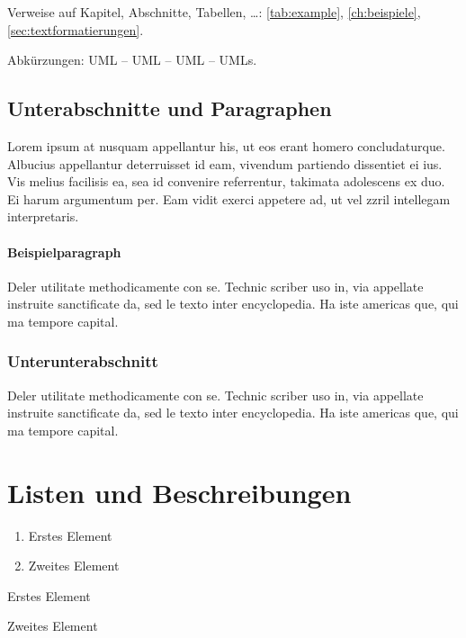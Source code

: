 Verweise auf Kapitel, Abschnitte, Tabellen, \dots: \autoref{tab:example}, \autoref{ch:beispiele}, \autoref{sec:textformatierungen}.

Abkürzungen: \ac{UML} -- \acs{UML} -- \acf{UML} -- \acp{UML}. 

\subsection{Unterabschnitte und Paragraphen}
Lorem ipsum at nusquam appellantur his, ut eos erant homero concludaturque. Albucius appellantur deterruisset id eam, vivendum partiendo dissentiet ei ius. Vis melius facilisis ea, sea id convenire referrentur, takimata adolescens ex duo. Ei harum argumentum per. Eam vidit exerci appetere ad, ut vel zzril intellegam interpretaris.

\paragraph{Beispielparagraph} 
Deler utilitate methodicamente con se. Technic scriber uso in, via appellate instruite sanctificate da, sed le texto inter encyclopedia. Ha iste americas que, qui ma tempore capital. 

\subsubsection{Unterunterabschnitt}
Deler utilitate methodicamente con se. Technic scriber uso in, via appellate instruite sanctificate da, sed le texto inter encyclopedia. Ha iste americas que, qui ma tempore capital. 


\section{Listen und Beschreibungen}

\begin{enumerate}
    \item Erstes Element
    \item Zweites Element 
\end{enumerate}

\lipsum[1]

\begin{aenumerate}
    \item Erstes Element
    \item Zweites Element
\end{aenumerate}

\lipsum[1]

